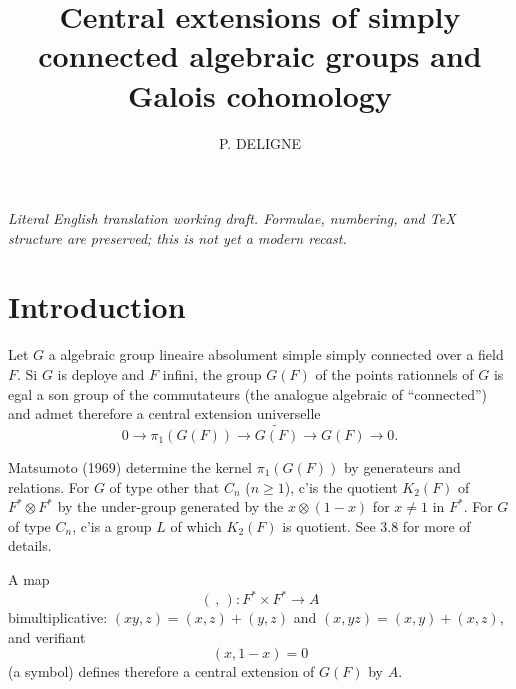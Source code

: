 \documentclass[11pt,a4paper]{article}
\theoremstyle{plain}
\theoremstyle{definition}
\begin{document}
\begin{center}\small\emph{Literal English translation working draft. Formulae, numbering, and TeX structure are preserved; this is not yet a modern recast.}\end{center}
\vspace{0.5em}


\title{Central extensions of simply connected algebraic groups and Galois cohomology}
\author{P. DELIGNE}
\date{}
\maketitle

\tableofcontents

\section*{Introduction}

Let $G$ a algebraic group lineaire absolument simple simply connected over a field $F$. Si $G$ is deploye and $F$ infini, the group $G(F)$ of the points rationnels of $G$ is egal a son group of the commutateurs (the analogue algebraic of ``connected'') and admet therefore a central extension universelle
\begin{equation}\label{0.1}
0 \to \pi_1(G(F)) \to \widetilde{G(F)} \to G(F) \to 0.
\end{equation}

Matsumoto (1969) determine the kernel $\pi_1(G(F))$ by generateurs and relations. For $G$ of type other that $C_n$ ($n \geq 1$), c'is the quotient $K_2(F)$ of $F^* \otimes F^*$ by the under-group generated by the $x \otimes (1-x)$ for $x \neq 1$ in $F^*$. For $G$ of type $C_n$, c'is a group $L$ of which $K_2(F)$ is quotient. See 3.8 for more of details.

A map
\[
(\, , \,) : F^* \times F^* \to A
\]
bimultiplicative: $(xy,z) = (x,z) + (y,z)$ and $(x,yz) = (x,y) + (x,z)$, and verifiant
\begin{equation}\label{0.2}
(x, 1-x) = 0
\end{equation}
(a symbol) defines therefore a central extension of $G(F)$ by $A$.
\end{document}
